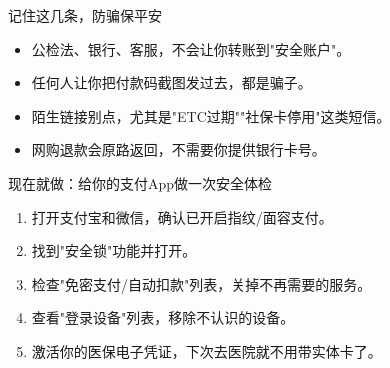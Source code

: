 \begin{tcbwarn}{记住这几条，防骗保平安}
\begin{itemize}
  \item 公检法、银行、客服，不会让你转账到"安全账户"。
  \item 任何人让你把付款码截图发过去，都是骗子。
  \item 陌生链接别点，尤其是"ETC过期""社保卡停用"这类短信。
  \item 网购退款会原路返回，不需要你提供银行卡号。
\end{itemize}

\end{tcbwarn}

\begin{tcbpractice}{现在就做：给你的支付App做一次安全体检}
\begin{enumerate}
  \item 打开支付宝和微信，确认已开启指纹/面容支付。
  \item 找到"安全锁"功能并打开。
  \item 检查"免密支付/自动扣款"列表，关掉不再需要的服务。
  \item 查看"登录设备"列表，移除不认识的设备。
  \item 激活你的医保电子凭证，下次去医院就不用带实体卡了。
\end{enumerate}

\end{tcbpractice}

